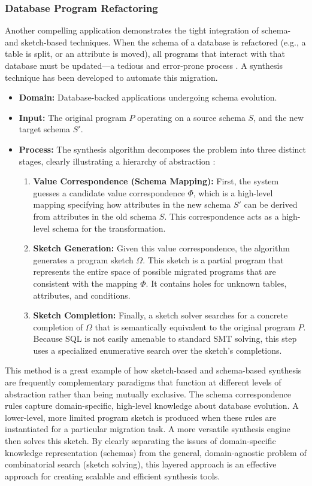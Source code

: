 \documentclass[12pt, a4paper]{report}
\begin{document}
\subsubsection{Database Program Refactoring}
Another compelling application demonstrates the tight integration of schema- and sketch-based techniques. When the schema of a database is refactored (e.g., a table is split, or an attribute is moved), all programs that interact with that database must be updated---a tedious and error-prone process \citep{qiu2018synthesizing}. A synthesis technique has been developed to automate this migration.
\begin{itemize}
    \item \textbf{Domain:} Database-backed applications undergoing schema evolution.
    \item \textbf{Input:} The original program $P$ operating on a source schema $S$, and the new target schema $S'$.
    \item \textbf{Process:} The synthesis algorithm decomposes the problem into three distinct stages, clearly illustrating a hierarchy of abstraction \citep{qiu2018synthesizing}:
    \begin{enumerate}
        \item \textbf{Value Correspondence (Schema Mapping):} First, the system guesses a candidate value correspondence $\Phi$, which is a high-level mapping specifying how attributes in the new schema $S'$ can be derived from attributes in the old schema $S$. This correspondence acts as a high-level schema for the transformation.
        \item \textbf{Sketch Generation:} Given this value correspondence, the algorithm generates a program sketch $\Omega$. This sketch is a partial program that represents the entire space of possible migrated programs that are consistent with the mapping $\Phi$. It contains holes for unknown tables, attributes, and conditions.
        \item \textbf{Sketch Completion:} Finally, a sketch solver searches for a concrete completion of $\Omega$ that is semantically equivalent to the original program $P$. Because SQL is not easily amenable to standard SMT solving, this step uses a specialized enumerative search over the sketch's completions.
    \end{enumerate}
\end{itemize}
This method is a great example of how sketch-based and schema-based synthesis are frequently complementary paradigms that function at different levels of abstraction rather than being mutually exclusive. The schema correspondence rules capture domain-specific, high-level knowledge about database evolution. A lower-level, more limited program sketch is produced when these rules are instantiated for a particular migration task. A more versatile synthesis engine then solves this sketch. By clearly separating the issues of domain-specific knowledge representation (schemas) from the general, domain-agnostic problem of combinatorial search (sketch solving), this layered approach is an effective approach for creating scalable and efficient synthesis tools.
\end{document}
